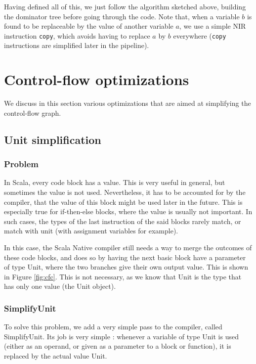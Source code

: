 \documentclass[11pt,a4paper]{article}
\newcommand{\scala}[1]{\textsf{#1}}
\newcommand{\nir}[1]{\texttt{#1}}
\begin{document}
Having defined all of this, we just follow the algorithm sketched above, building the dominator tree before going through the code. Note that, when a variable $b$ is found to be replaceable by the value of another variable $a$, we use a simple NIR instruction \nir{copy}, which avoids having to replace $a$ by $b$ everywhere (\nir{copy} instructions are simplified later in the pipeline).

\section{Control-flow optimizations}

We discuss in this section various optimizations that are aimed at simplifying the control-flow graph.

\subsection{Unit simplification}

\subsubsection*{Problem}

In Scala, every code block has a value. This is very useful in general, but sometimes the value is not used. Nevertheless, it has to be accounted for by the compiler, that the value of this block might be used later in the future. This is especially true for if-then-else blocks, where the value is usually not important. In such cases, the types of the last instruction of the said blocks rarely match, or match with unit (with assignment variables for example).


In this case, the Scala Native compiler still needs a way to merge the outcomes of these code blocks, and does so by having the next basic block have a parameter of type \scala{Unit}, where the two branches give their own output value. This is shown in Figure \ref{fig:cfc}. This is not necessary, as we know that \scala{Unit} is the type that has only one value (the \scala{Unit} object).

\subsubsection*{SimplifyUnit}

To solve this problem, we add a very simple pass to the compiler, called \scala{SimplifyUnit}. Its job is very simple : whenever a variable of type \scala{Unit} is used (either as an operand, or given as a parameter to a block or function), it is replaced by the actual value \scala{Unit}.
\end{document}
